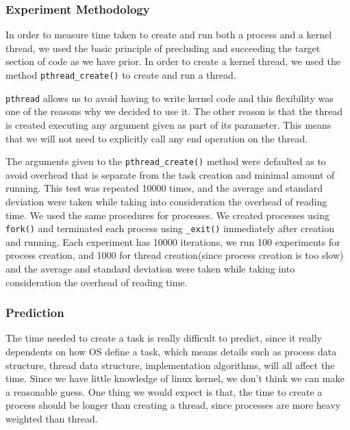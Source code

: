 \documentclass{article} %
\begin{document}
\subsubsection{Experiment Methodology}
In order to measure time taken to create and run both a process and a kernel
thread, we used the basic principle of precluding and succeeding the target
section of code as we have prior. In order to create a kernel thread, we used
the method \texttt{pthread\_create()} to create and run a thread.

\texttt{pthread} allows us to avoid having to write kernel code and this
flexibility was one of the reasons why we decided to use it. The other reason
is that the thread is created executing any argument given as part of its
parameter. This means that we will not need to explicitly call any end
operation on the thread.

The arguments given to the \texttt{pthread\_create()} method were defaulted as
to avoid overhead that is separate from the task creation and minimal amount
of running. This test was repeated 10000 times, and the average and standard
deviation were taken while taking into consideration the overhead of reading
time. We used the same procedures for processes. We created processes using
\texttt{fork()} and terminated each process using \texttt{\_exit()}
immediately after creation and running.  Each experiment has 10000 iterations,
we run 100 experiments for process creation, and 1000 for thread
creation(since process creation is too slow) and the average and standard
deviation were taken while taking into consideration the overhead of reading
time.

\subsubsection{Prediction}
The time needed to create a task is really difficult to predict, since it
really dependents on how OS define a task, which means details such as process
data structure, thread data structure, implementation algorithms, will all
affect the time. Since we have little knowledge of linux kernel, we don't
think we can make a reasonable guess. One thing we would expect is that, the
time to create a process should be longer than creating a thread, since
processes are more heavy weighted than thread.
\end{document}

